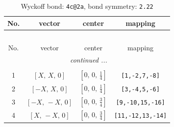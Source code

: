 \documentclass[fleqn,8pt]{jsarticle}
\begin{document}
\renewcommand{\arraystretch}{1.2}
\begin{longtable}{cccc}
\caption{Wyckoff bond: {\tt 4c@2a}, bond symmetry: {\tt 2.22}}
 \\
 \hline \hline
No. & vector & center & mapping \\ \hline \endfirsthead

\multicolumn{3}{l}{\tablename\ \thetable{}} \\
 \hline \hline
No. & vector & center & mapping \\ \hline \endhead

 \hline \hline
\multicolumn{3}{r}{\footnotesize\it continued ...} \\ \endfoot

 \hline \hline
\multicolumn{3}{r}{} \\ \endlastfoot

1 & $\left[ X,\, X,\, 0 \right]$ & $\left[ 0,\, 0,\, \frac{1}{4} \right]$ & {\tt [1,-2,7,-8]} \\ \hline
2 & $\left[ - X,\, X,\, 0 \right]$ & $\left[ 0,\, 0,\, \frac{1}{4} \right]$ & {\tt [3,-4,5,-6]} \\ \hline
3 & $\left[ - X,\, - X,\, 0 \right]$ & $\left[ 0,\, 0,\, \frac{3}{4} \right]$ & {\tt [9,-10,15,-16]} \\ \hline
4 & $\left[ X,\, - X,\, 0 \right]$ & $\left[ 0,\, 0,\, \frac{3}{4} \right]$ & {\tt [11,-12,13,-14]} \\
\end{longtable}
\renewcommand{\arraystretch}{1.2}
\end{document}
